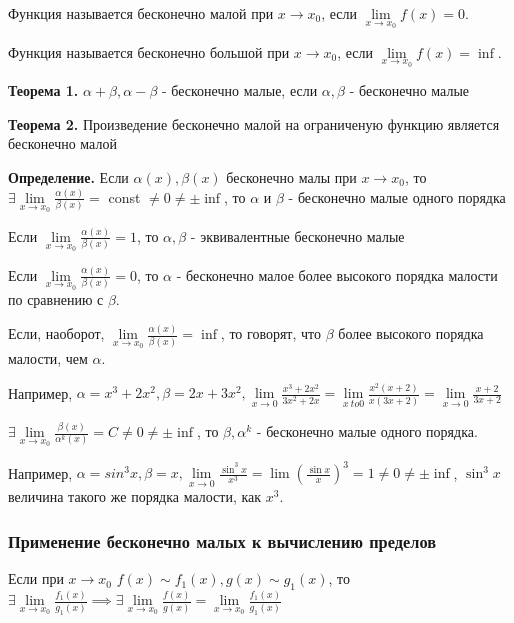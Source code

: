 \documentclass{article}
\begin{document}
\begin{flushleft}

Функция называется бесконечно малой при $x \to x_0$, если $\lim\limits_{x \to x_0} f(x) = 0$.

Функция называется бесконечно большой при $x \to x_0$, если $\lim\limits_{x \to x_0} f(x) = \inf$.

\textbf{Теорема 1.} $\alpha + \beta, \alpha - \beta$ - бесконечно малые, если $\alpha, \beta$ - бесконечно малые

\textbf{Теорема 2.} Произведение бесконечно малой на ограниченую функцию является бесконечно малой

\textbf{Определение.} Если $\alpha(x), \beta(x)$ бесконечно малы при $x \to x_0$, то $\exists \lim\limits_{x \to x_0} \frac{\alpha(x)}{\beta(x)} = $ const $ \ne 0 \ne \pm \inf$, то $\alpha$ и $\beta$ - бесконечно малые одного порядка

Если $\lim\limits_{x \to x_0} \frac{\alpha(x)}{\beta(x)} = 1$, то $\alpha, \beta$ - эквивалентные бесконечно малые

\hfill

Если $\lim\limits_{x \to x_0} \frac{\alpha(x)}{\beta(x)} = 0$, то $\alpha$ - бесконечно малое более высокого порядка малости по сравнению с $\beta$.

Если, наоборот, $\lim\limits_{x \to x_0} \frac{\alpha(x)}{\beta(x)} = \inf$, то говорят, что $\beta$ более высокого порядка малости, чем $\alpha$.

Например, $\alpha = x^3 + 2x^2, \beta = 2x + 3x^2, \lim\limits_{x \to 0} \frac{x^3 + 2x^2}{3x^2 + 2x} = \lim\limits_{x \ to 0} \frac{x^2(x+2)}{x(3x + 2)} = \lim\limits_{x \to 0} \frac{x + 2}{3x + 2}$

\hfill

$\exists \lim\limits_{x \to x_0} \frac{\beta(x)}{\alpha^k(x)} = C \ne 0 \ne \pm \inf$, то $\beta, \alpha^k$ - бесконечно малые одного порядка.

Например, $\alpha = sin^3 x, \beta = x, \lim\limits_{x \to 0} \frac{\sin^3 x}{x^3} = \lim (\frac{\sin x}{x})^3 = 1 \ne 0 \ne \pm \inf$, $\sin^3 x$ величина такого же порядка малости, как $x^3$.

\subsubsection{Применение бесконечно малых к вычислению пределов}

Если при $x \to x_0$  $f(x) \sim f_1(x), g(x) \sim g_1(x)$, то $\exists \lim\limits_{x \to x_0} \frac{f_1(x)}{g_1(x)} \implies \exists \lim\limits_{x \to x_0} \frac{f(x)}{g(x)} = \lim\limits_{x \to x_0} \frac{f_1(x)}{g_1(x)}$ 


\end{flushleft}
\end{document}
